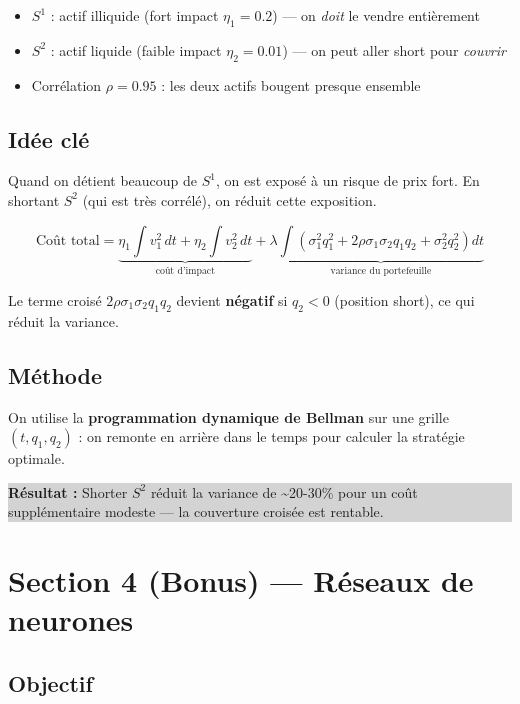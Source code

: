 \documentclass[12pt,a4paper]{article}
\begin{document}
\begin{itemize}[noitemsep]
    \item $S^1$ : actif illiquide (fort impact $\eta_1 = 0.2$) — on \emph{doit} le vendre entièrement
    \item $S^2$ : actif liquide (faible impact $\eta_2 = 0.01$) — on peut aller short pour \emph{couvrir}
    \item Corrélation $\rho = 0.95$ : les deux actifs bougent presque ensemble
\end{itemize}

\subsection{Idée clé}

Quand on détient beaucoup de $S^1$, on est exposé à un risque de prix fort. En shortant $S^2$ (qui est très corrélé), on réduit cette exposition.

\[
\text{Coût total} = \underbrace{\eta_1 \int v_1^2\,dt + \eta_2 \int v_2^2\,dt}_{\text{coût d'impact}}
+ \lambda \underbrace{\int \left(\sigma_1^2 q_1^2 + 2\rho\sigma_1\sigma_2 q_1 q_2 + \sigma_2^2 q_2^2\right)dt}_{\text{variance du portefeuille}}
\]

Le terme croisé $2\rho\sigma_1\sigma_2 q_1 q_2$ devient \textbf{négatif} si $q_2 < 0$ (position short), ce qui réduit la variance.

\subsection{Méthode}

On utilise la \textbf{programmation dynamique de Bellman} sur une grille $(t, q_1, q_2)$ : on remonte en arrière dans le temps pour calculer la stratégie optimale.

\medskip
\colorbox{lightgray}{\parbox{\linewidth}{\small
\textbf{Résultat :} Shorter $S^2$ réduit la variance de \textasciitilde20-30\% pour un coût supplémentaire modeste — la couverture croisée est rentable.
}}

\section{Section 4 (Bonus) — Réseaux de neurones}

\subsection{Objectif}
\end{document}

